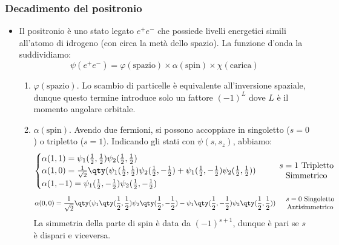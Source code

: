 \subsubsection{Decadimento del positronio}
\begin{itemize}
\item Il positronio è uno stato legato $e^+e^-$ che possiede livelli energetici simili all'atomo di idrogeno (con circa la metà dello spazio). La funzione d'onda la suddividiamo:
\begin{equation*}
\psi(e^+e^-)=\varphi(\text{spazio})\times\alpha(\text{spin})\times \chi(\text{carica})
\end{equation*}
\begin{enumerate}
    \item $\varphi(\text{spazio})$. Lo scambio di particelle è equivalente all'inversione spaziale, dunque questo termine introduce solo un fattore $(-1)^L$ dove $L$ è il momento angolare orbitale.
    \item $\alpha(\text{spin})$. Avendo due fermioni, si possono accoppiare in singoletto ($s=0$) o tripletto ($s=1$). Indicando gli stati con $\psi(s,s_z)$, abbiamo:
    \begin{equation*}
        \begin{cases}
            \alpha(1,1)=\psi_1(\frac12,\frac12)\psi_2(\frac12,\frac12)\\
            \alpha(1,0)=\frac1{\sqrt2}\qty(\psi_1(\frac12,\frac12)\psi_2(\frac12,-\frac12)+\psi_1(\frac12,-\frac12)\psi_2(\frac12,\frac12))\\
            \alpha(1,-1)=\psi_1(\frac12,-\frac12)\psi_2(\frac12,-\frac12)
        \end{cases}\quad
        \begin{array}{c}
            s=1\text{ Tripletto}\\
            \text{Simmetrico}
         \end{array} 
    \end{equation*}
    \begin{equation*}
        \alpha(0,0)=\frac1{\sqrt2}\qty(\psi_1\qty(\frac12,\frac12)\psi_2\qty(\frac12,-\frac12)-\psi_1\qty(\frac12,-\frac12)\psi_2\qty(\frac12,\frac12))\quad\begin{array}{c}
            s=0\text{ Singoletto}\\
            \text{Antisimmetrico}
         \end{array}
    \end{equation*}
    La simmetria della parte di spin è data da $(-1)^{s+1}$, dunque è pari se $s$ è dispari e viceversa.

\end{enumerate}
\end{itemize}
